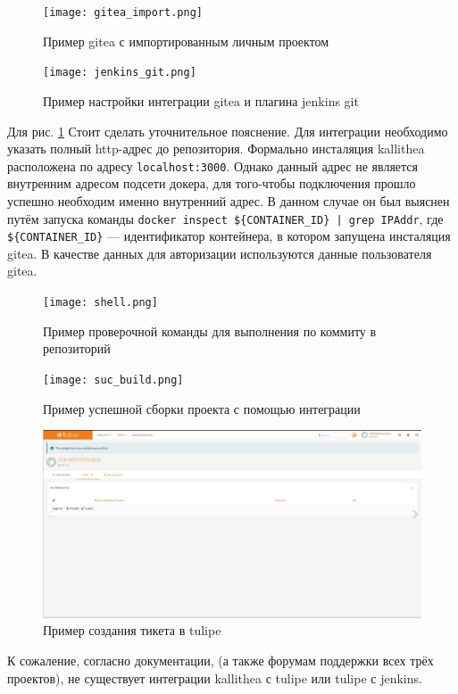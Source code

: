 \documentclass[a4paper]{extarticle}
\begin{document}
\begin{figure}[H]
\texttt{[image: gitea\_import.png]}
\caption{Пример gitea с импортированным личным проектом}
\end{figure}

\begin{figure}[H]
\texttt{[image: jenkins\_git.png]}
\caption{Пример настройки интеграции gitea и плагина jenkins git}
\label{fig:git}
\end{figure}

Для рис. \ref{fig:git} Стоит сделать уточнительное пояснение. Для интеграции необходимо указать полный http-адрес до репозитория. Формально инсталяция kallithea расположена по адресу \texttt{localhost:3000}. Однако данный адрес не является внутренним адресом подсети докера, для того-чтобы подключения прошло успешно необходим именно внутренний адрес. В данном случае он был выяснен путём запуска команды
\verb#docker inspect ${CONTAINER_ID} | grep IPAddr#, где \verb#${CONTAINER_ID}# --- идентификатор контейнера, в котором запущена инсталяция gitea. В качестве данных  для авторизации используются данные пользователя gitea.

\begin{figure}[H]
\texttt{[image: shell.png]}
\caption{Пример проверочной команды для выполнения по коммиту в репозиторий}
\end{figure}

\begin{figure}[H]
\texttt{[image: suc\_build.png]}
\caption{Пример успешной сборки проекта с помощью интеграции}
\end{figure}

\begin{figure}[H]
\includegraphics[width=\textwidth,height=\textheight,keepaspectratio]{tulipe.png}
\caption{Пример создания тикета в tulipe}
\end{figure}

К сожаление, согласно документации, (а также  форумам поддержки всех трёх проектов), не существует интеграции kallithea с tulipe или tulipe с jenkins.
\end{document}
